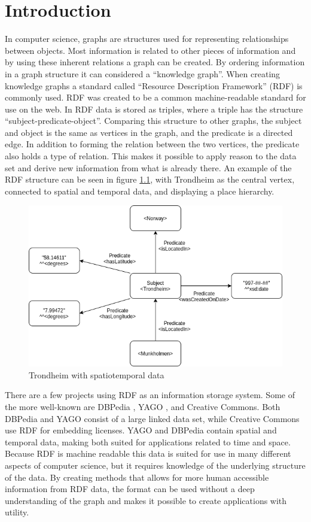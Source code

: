 \chapter{Introduction}
\label{cha:Introduction}
In computer science, graphs are structures used for representing relationships between objects. Most information is related to other pieces of information and by using these inherent relations a graph can be created. By ordering information in a graph structure it can considered a ``knowledge graph''. When creating knowledge graphs a standard called ``Resource Description Framework'' (RDF) is commonly used. RDF was created to be a common machine-readable standard for use on the web. In RDF data is stored as triples, where a triple has the structure ``subject-predicate-object''. Comparing this structure to other graphs, the subject and object is the same as vertices in the graph, and the predicate is a directed edge. In addition to forming the relation between the two vertices, the predicate also holds a type of relation. This makes it possible to apply reason to the data set and derive new information from what is already there. An example of the RDF structure can be seen in figure \ref{fig:spatiotemporalTrondheim}, with Trondheim as the central vertex, connected to spatial and temporal data, and displaying a place hierarchy.

\begin{figure}[h]
  \centering
  \includegraphics[scale=0.5]{figs/rdfSPO.png}
 \caption{Trondheim with spatiotemporal data}
 \label{fig:spatiotemporalTrondheim}
\end{figure}

There are a few projects using RDF as an information storage system. Some of the more well-known are DBPedia \cite{dbpedia}, YAGO \cite{yago}, and Creative Commons. Both DBPedia and YAGO consist of a large linked data set, while Creative Commons use RDF for embedding licenses. YAGO and DBPedia contain spatial and temporal data, making both suited for applications related to time and space. Because RDF is machine readable this data is suited for use in many different aspects of computer science, but it requires knowledge of the underlying structure of the data. By creating methods that allows for more human accessible information from RDF data, the format can be used without a deep understanding of the graph and makes it possible to create applications with utility.

